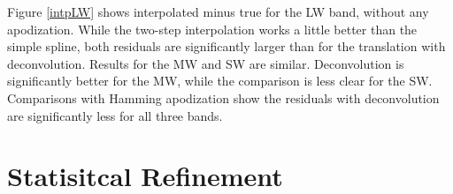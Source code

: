 \documentclass[12pt]{article}
\begin{document}
Figure \ref{intpLW} shows interpolated {\cris} minus true {\cris} 
for the LW band, without any apodization.  While the two-step
interpolation works a little better than the simple spline, both
residuals are significantly larger than for the translation with
deconvolution.  Results for the MW and SW are similar.  Deconvolution
is significantly better for the MW, while the comparison is less
clear for the SW.  Comparisons with Hamming apodization show the
residuals with deconvolution are significantly less for all three
bands.

\FloatBarrier
\section{Statisitcal Refinement}
\label{statfix}

\FloatBarrier


\end{document}
